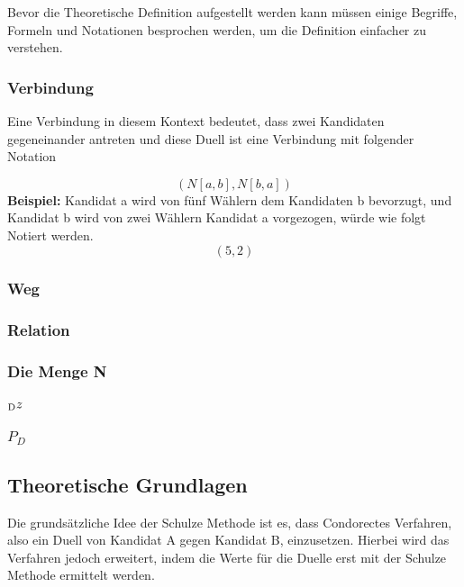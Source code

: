 Bevor die Theoretische Definition aufgestellt werden kann müssen einige Begriffe, Formeln und Notationen besprochen werden, um die Definition einfacher zu verstehen.


\subsubsection{Verbindung}
\label{verbindung}
Eine Verbindung in diesem Kontext bedeutet, dass zwei Kandidaten gegeneinander antreten und diese Duell ist eine Verbindung mit folgender Notation

\[
(N[a,b],N[b,a])
\]
\textbf{Beispiel:}
Kandidat a wird von fünf Wählern dem Kandidaten b bevorzugt, und Kandidat b wird von zwei Wählern Kandidat a vorgezogen, würde wie folgt Notiert werden. 
\[
(5,2)
\]

\subsubsection{Weg}
\label{weg}

\subsubsection{Relation}
\label{relation}

\subsubsection{Die Menge N}
\label{mengeN}


\subsubsection{$\textsubscript{D}z$}
\label{dz}

\subsubsection{$P_{D}$}
\label{PD}

\subsection{Theoretische Grundlagen} 
\label{sec:theoretische Grundlagen}

Die grundsätzliche Idee der Schulze Methode ist es, dass Condorectes Verfahren, also ein Duell von Kandidat A gegen Kandidat B, einzusetzen. Hierbei wird das Verfahren jedoch erweitert, indem die Werte für die Duelle erst mit der Schulze Methode ermittelt werden.

